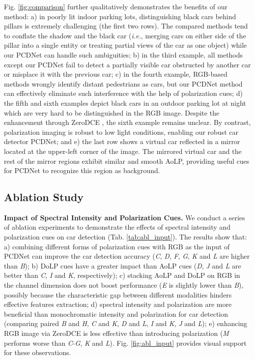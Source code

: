 Fig. \ref{fig:comparison} further qualitatively demonstrates the benefits of our method: a) in poorly lit indoor parking lots, distinguishing black cars behind pillars is extremely challenging (the first two rows). The compared methods tend to conflate the shadow and the black car (\textit{i.e.}, merging cars on either side of the pillar into a single entity or treating partial views of the car as one object) while our PCDNet can handle such ambiguities; b) in the third example, all methods except our PCDNet fail to detect a partially visible car obstructed by another car or misplace it with the previous car; c) in the fourth example, RGB-based methods wrongly identify distant pedestrians as cars, but our PCDNet method can effectively eliminate such interference with the help of polarization cues; d) the fifth and sixth examples depict black cars in an outdoor parking lot at night which are very hard to be distinguished in the RGB image. Despite the enhancement through ZeroDCE \cite{guo2020zero}, the sixth example remains unclear. By contrast, polarization imaging is robust to low light conditions, enabling our robust car detector PCDNet; and e) the last row shows a virtual car reflected in a mirror located at the upper-left corner of the image. The mirrored virtual car and the rest of the mirror regions exhibit similar and smooth AoLP, providing useful cues for PCDNet to recognize this region as background. 


\subsection{Ablation Study}
\textbf{Impact of Spectral Intensity and Polarization Cues.} We conduct a series of ablation experiments to demonstrate the effects of spectral intensity and polarization cues on car detection (Tab. \ref{tab:abl_input}).
The results show that: a) combining different forms of polarization cues with RGB as the input of PCDNet can improve the car detection accuracy (\textit{C}, \textit{D}, \textit{F}, \textit{G}, \textit{K} and \textit{L} are higher than \textit{B}); b) DoLP cues have a greater impact than AoLP cues (\textit{D}, \textit{J} and \textit{L} are better than \textit{C}, \textit{I} and \textit{K}, respectively); c) stacking AoLP and DoLP on RGB in the channel dimension does not boost performance (\textit{E} is slightly lower than \textit{B}), possibly because the characteristic gap between different modalities hinders effective features extraction; d) spectral intensity and polarization are more beneficial than monochromatic intensity and polarization for car detection (comparing paired \textit{B} and \textit{H}, \textit{C} and \textit{K}, \textit{D} and \textit{L}, \textit{I} and \textit{K}, \textit{J} and \textit{L}); e) enhancing RGB image via ZeroDCE \cite{guo2020zero} is less effective than introducing polarization (\textit{M} performs worse than \textit{C}-\textit{G}, \textit{K} and \textit{L}).
Fig. \ref{fig:abl_input} provides visual support for these observations.

